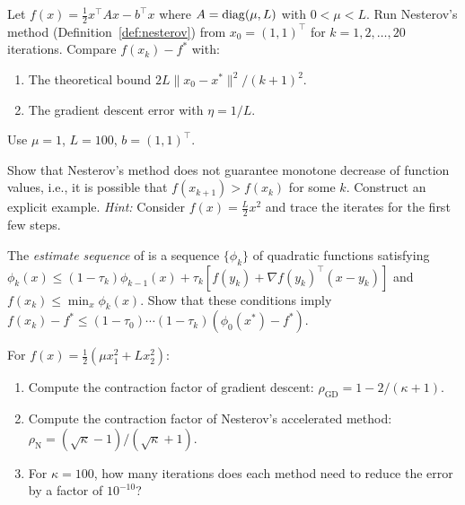 \documentclass[11pt,a4paper]{article}
\begin{document}
\begin{exercise}\label{ex:nesterov-quad}
Let $f(x) = \frac{1}{2}x^\top A x - b^\top x$ where
$A = \operatorname{diag}(\mu, L)$ with $0 < \mu < L$. Run Nesterov's method
(Definition~\ref{def:nesterov}) from $x_0 = (1, 1)^\top$ for
$k = 1, 2, \dots, 20$ iterations. Compare $f(x_k) - f^*$ with:
\begin{enumerate}[label=(\alph*)]
  \item The theoretical bound $2L\|x_0 - x^*\|^2/(k+1)^2$.
  \item The gradient descent error with $\eta = 1/L$.
\end{enumerate}
Use $\mu = 1$, $L = 100$, $b = (1, 1)^\top$.
\end{exercise}

\begin{exercise}\label{ex:non-monotone}
Show that Nesterov's method does not guarantee monotone decrease of
function values, i.e., it is possible that $f(x_{k+1}) > f(x_k)$ for
some $k$. Construct an explicit example.
\emph{Hint:} Consider $f(x) = \frac{L}{2}x^2$ and trace the iterates
for the first few steps.
\end{exercise}

\begin{exercise}%
\label{ex:estimate-seq}
The \emph{estimate sequence} of \citet{nesterov2004} is a sequence
$\{\phi_k\}$ of quadratic functions satisfying
$\phi_k(x) \le (1 - \tau_k)\phi_{k-1}(x) + \tau_k[f(y_k) +
\nabla f(y_k)^\top(x - y_k)]$ and $f(x_k) \le \min_x \phi_k(x)$.
Show that these conditions imply $f(x_k) - f^* \le (1-\tau_0)\cdots
(1-\tau_k)(\phi_0(x^*) - f^*)$.
\end{exercise}

\begin{exercise}\label{ex:sc-accel}
For $f(x) = \frac{1}{2}(\mu x_1^2 + L x_2^2)$:
\begin{enumerate}[label=(\alph*)]
  \item Compute the contraction factor of gradient descent:
    $\rho_{\text{GD}} = 1 - 2/(\kappa + 1)$.
  \item Compute the contraction factor of Nesterov's accelerated
    method: $\rho_{\text{N}} = (\sqrt\kappa - 1)/(\sqrt\kappa + 1)$.
  \item For $\kappa = 100$, how many iterations does each method need
    to reduce the error by a factor of $10^{-10}$?
\end{enumerate}
\end{exercise}
\end{document}
